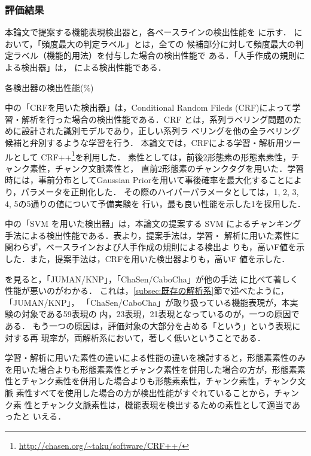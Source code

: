 \documentclass[japanese]{jnlp_1.3e}
\begin{document}
\subsubsection{評価結果}

本論文で提案する機能表現検出器と，各ベースラインの検出性能を
に示す．
において，「頻度最大の判定ラベル」とは，全ての
候補部分に対して頻度最大の判定ラベル（機能的用法）を付与した場合の検出性能で
ある．「人手作成の規則による検出器」は，
\cite{形態素情報を用いた日本語機能表現の検出}による検出性能である．

\begin{table}[b]
  \caption{各検出器の検出性能(\%)}
  \label{tab:kekka_gaiyou}

\end{table}


中の「CRFを用いた検出器」は，Conditional Random
Fileds (CRF)\cite{CRF}によって学習・解析を行った場合の検出性能である．CRF 
とは，系列ラベリング問題のために設計された識別モデルであり，正しい系列ラ
ベリングを他の全ラベリング候補と弁別するような学習を行う．
本論文では，CRFによる学習・解析用ツールとして
CRF++\footnote{\url{http://chasen.org/~taku/software/CRF++/}}を利用した．
素性としては，前後2形態素の形態素素性，チャンク素性，チャンク文脈素性と，
直前2形態素のチャンクタグを用いた．学習時には，事前分布としてGaussian
Priorを用いて事後確率を最大化することにより，パラメータを正則化した\cite{TKudo04b}．
その際のハイパーパラメータとしては，1, 2, 3, 4, 5の5通りの値について予備実験を
行い，最も良い性能を示した1を採用した．

中の「SVM を用いた検出器」は，本論文の提案する 
SVM によるチャンキング手法による検出性能である．表より，提案手法は，学習・
解析に用いた素性に関わらず，ベースラインおよび人手作成の規則による検出よ
りも，高いF値を示した．また，提案手法は，CRFを用いた検出器よりも，高いF 
値を示した．

を見ると，「JUMAN/KNP」，「ChaSen/CaboCha」が他の手法
に比べて著しく性能が悪いのがわかる．
これは，\ref{subsec:既存の解析系}節で述べたように，「JUMAN/KNP」，
「ChaSen/CaboCha」が取り扱っている機能表現が，本実験の対象である59表現の
内，23表現，21表現となっているのが，一つの原因である．
もう一つの原因は，評価対象の大部分を占める「という」という表現に対する再
現率が，両解析系において，著しく低いということである．

学習・解析に用いた素性の違いによる性能の違いを検討すると，形態素素性のみ
を用いた場合よりも形態素素性とチャンク素性を併用した場合の方が，形態素素
性とチャンク素性を併用した場合よりも形態素素性，チャンク素性，チャンク文脈
素性すべてを使用した場合の方が検出性能がすぐれていることから，チャンク素
性とチャンク文脈素性は，機能表現を検出するための素性として適当であったと
いえる．
\end{document}
